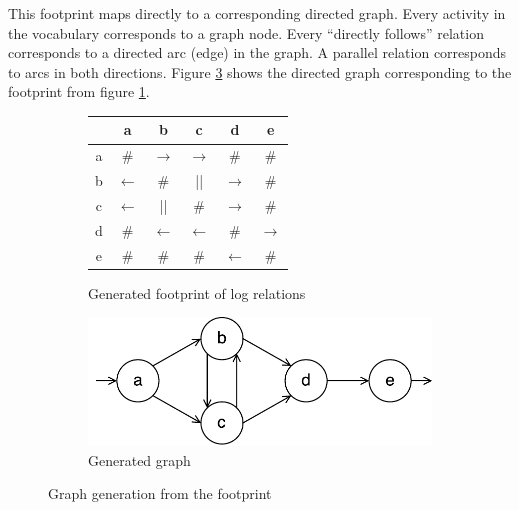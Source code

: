 This footprint maps directly to a corresponding directed graph.
Every activity in the vocabulary corresponds to a graph node.
Every ``directly follows'' relation corresponds to a directed arc (edge) in the graph. A parallel relation corresponds to arcs in both directions.
Figure \ref{fig:examplegraph} shows the directed graph corresponding to the footprint from figure \ref{tab:examplefootprint}.

\begin{figure}
    \centering
    \begin{subfigure}[h]{0.4\linewidth}
        \begin{center}
        \begin{tabular}{|c|ccccc|}
        \hline
          & a & b & c & d & e\\
        \hline
        a & \# & $\rightarrow$ & $\rightarrow$ & \# & \# \\
        b & $\leftarrow$ & \# & || & $\rightarrow$ & \# \\
        c & $\leftarrow$ & || & \# & $\rightarrow$ & \# \\
        d & \# & $\leftarrow$ & $\leftarrow$ & \# & $\rightarrow$ \\
        e & \# & \# & \# & $\leftarrow$ & \# \\
        \hline
        \end{tabular}
        \end{center}
        \caption{Generated footprint of log relations}
        \label{tab:examplefootprint}
    \end{subfigure}
    \begin{subfigure}[h]{0.4\linewidth}
        \centering \includegraphics[width=\linewidth]{gfx/figures/graphthing.pdf}
        \caption{Generated graph}
        \label{fig:examplegraph}
    \end{subfigure}
    \caption{Graph generation from the footprint}
\end{figure}

